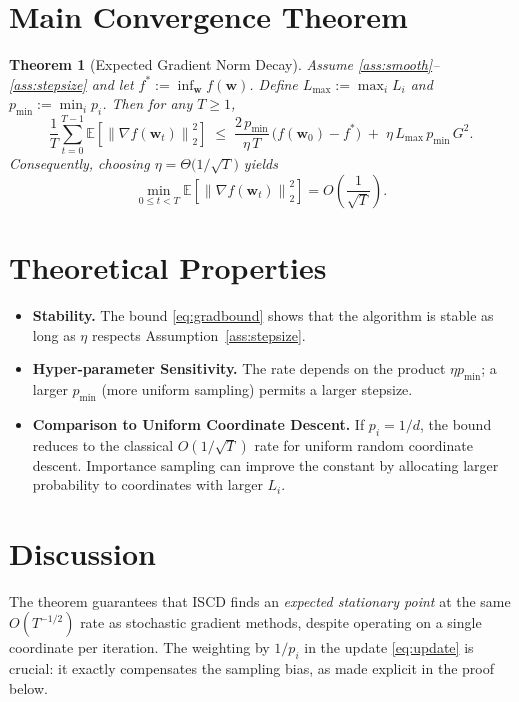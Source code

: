 \documentclass[11pt]{article}
\newtheorem{theorem}{Theorem}
\newcommand{\EE}{\mathbb{E}}
\newcommand{\norm}[1]{\left\|#1\right\|}
\newcommand{\grad}[1]{\nabla #1}
\begin{document}
\section*{Main Convergence Theorem}
\begin{theorem}[Expected Gradient Norm Decay]
\label{thm:main}
Assume \ref{ass:smooth}–\ref{ass:stepsize} and let $f^*:=\inf_{\mathbf{w}}f(\mathbf{w})$.
Define $L_{\max}:=\max_i L_i$ and $p_{\min}:=\min_i p_i$.
Then for any $T\ge1$,
\begin{equation}
\label{eq:gradbound}
\frac{1}{T}\sum_{t=0}^{T-1}\EE\!\left[\norm{\grad f(\mathbf{w}_t)}_2^{2}\right]
\;\le\;
\frac{2\,p_{\min}}{\eta\,T}\,\bigl( f(\mathbf{w}_0)-f^{*}\bigr)
\;+\;
\eta\,L_{\max}\,p_{\min}\,G^{2}.
\end{equation}
Consequently, choosing $\eta = \Theta\!\bigl(1/\sqrt{T}\bigr)$ yields
\[
\min_{0\le t<T}\EE\!\left[\norm{\grad f(\mathbf{w}_t)}_2^{2}\right]
=O\!\left(\frac{1}{\sqrt{T}}\right).
\]
\end{theorem}

\section*{Theoretical Properties}
\begin{itemize}[leftmargin=*]
\item \textbf{Stability.} The bound \eqref{eq:gradbound} shows that the algorithm is
stable as long as $\eta$ respects Assumption~\ref{ass:stepsize}.
\item \textbf{Hyper‑parameter Sensitivity.} The rate depends on the product
$\eta p_{\min}$; a larger $p_{\min}$ (more uniform sampling) permits a larger
stepsize.
\item \textbf{Comparison to Uniform Coordinate Descent.}
If $p_i=1/d$, the bound reduces to the classical $O(1/\sqrt{T})$ rate for
uniform random coordinate descent.  Importance sampling can improve the constant
by allocating larger probability to coordinates with larger $L_i$.
\end{itemize}

\section*{Discussion}
The theorem guarantees that ISCD finds an \emph{expected stationary point}
at the same $O(T^{-1/2})$ rate as stochastic gradient methods, despite operating
on a single coordinate per iteration.  The weighting by $1/p_i$ in the update
\eqref{eq:update} is crucial: it exactly compensates the sampling bias,
as made explicit in the proof below.
\end{document}
